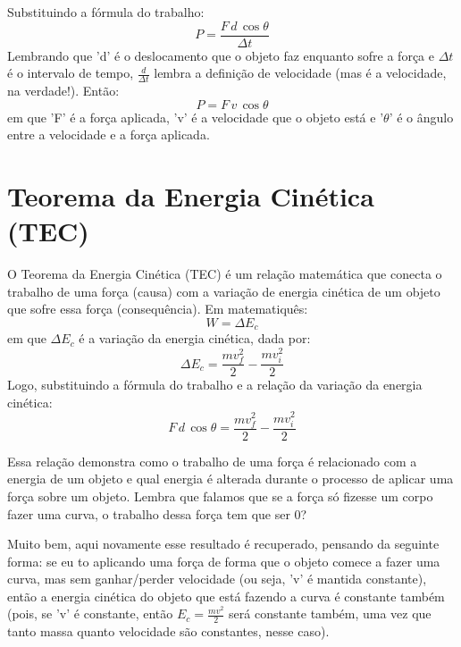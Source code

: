 \documentclass[12pt]{extarticle}
\newcommand{\<}{\langle}
\renewcommand{\>}{\rangle}
\theoremstyle{definition}
\begin{document}
Substituindo a fórmula do trabalho:
\begin{equation}
    P = \frac{F\,d\,\cos\theta}{\Delta t}
\end{equation}
Lembrando que 'd' é o deslocamento que o objeto faz enquanto sofre a força e $\Delta t$ é o intervalo de tempo, $\frac{d}{\Delta t}$ lembra a definição de velocidade (mas é a velocidade, na verdade!). Então:
\begin{equation}
    P = F\,v\,\cos\theta
\end{equation}
\noindent em que 'F' é a força aplicada, 'v' é a velocidade que o objeto está e '$\theta$' é o ângulo entre a velocidade e a força aplicada.

\section{Teorema da Energia Cinética (TEC)}

O Teorema da Energia Cinética (TEC) é um relação matemática que conecta o trabalho de uma força (causa) com a variação de energia cinética de um objeto que sofre essa força (consequência). Em matematiquês:
\begin{equation}
    W = \Delta E_c 
\end{equation}
\noindent em que $\Delta E_c$ é a variação da energia cinética, dada por:
\begin{equation}
    \Delta E_c= \frac{mv_f^2}{2}-\frac{mv_i^2}{2}
\end{equation}
Logo, substituindo a fórmula do trabalho e a relação da variação da energia cinética:
\begin{equation}
    F\,d\,\cos\theta = \frac{mv_f^2}{2}-\frac{mv_i^2}{2}
\end{equation}

Essa relação demonstra como o trabalho de uma força é relacionado com a energia de um objeto e qual energia é alterada durante o processo de aplicar uma força sobre um objeto. Lembra que falamos que se a força só fizesse um corpo fazer uma curva, o trabalho dessa força tem que ser 0?

Muito bem, aqui novamente esse resultado é recuperado, pensando da seguinte forma: se eu to aplicando uma força de forma que o objeto comece a fazer uma curva, mas sem ganhar/perder velocidade (ou seja, 'v' é mantida constante), então a energia cinética do objeto que está fazendo a curva é constante também (pois, se 'v' é constante, então $E_c = \frac{mv^2}{2}$ será constante também, uma vez que tanto massa quanto velocidade são constantes, nesse caso).
\end{document}
